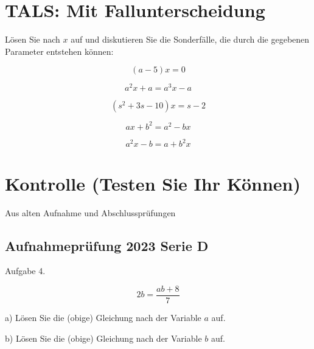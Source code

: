 \section{TALS: Mit Fallunterscheidung}
Lösen Sie nach $x$ auf und diskutieren Sie die Sonderfälle, die durch
die gegebenen Parameter entstehen können:
\begin{bbwAufgabenBlock}
\item $$(a-5)x = 0$$

\item $$a^2x+a = a^3x - a$$

\item $$(s^2 + 3s - 10)x = s-2$$

\item $$ax+b^2 = a^2 - bx$$

\item $$a^2x-b = a+b^2x$$
\end{bbwAufgabenBlock}
\newpage
\section{Kontrolle (Testen Sie Ihr Können)}

Aus alten Aufnahme und Abschlussprüfungen

\subsection{Aufnahmeprüfung 2023 Serie D}
Aufgabe 4.

$$2b = \frac{ab+8}{7}$$

a) Lösen Sie die (obige) Gleichung nach der Variable $a$ auf.


b) Lösen Sie die (obige) Gleichung nach der Variable $b$ auf.


